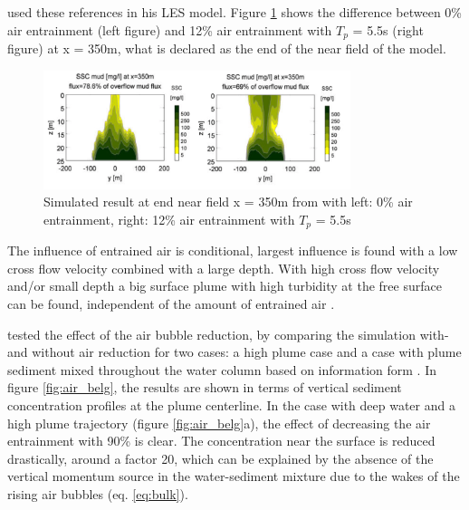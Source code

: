 \noindent \cite{Dewit} used these references in his LES model. Figure \ref{fig:air_dewit} shows the difference between 0\% air entrainment (left figure) and 12\% air entrainment with $T_p$ = 5.5s (right figure) at x = 350m, what is declared as the end of the near field of the model. 

\begin{figure}[ht!]
    \centering
    \includegraphics[width = 0.8\textwidth]{Images/air_0_12.png}
    \caption{Simulated result at end near field x =  350m from \cite{Dewit} with left: 0\% air entrainment, right: 12\% air entrainment with $T_p$ = 5.5s}
    \label{fig:air_dewit}
\end{figure}

\noindent The influence of entrained air is conditional, largest influence is found with a low cross flow velocity combined with a large depth. With high cross flow velocity and/or small depth a big surface plume with high turbidity at the free surface can be found, independent of the amount of entrained air \citep{Dewit}. \newline

\noindent \cite{Decrop} tested the effect of the air bubble reduction, by comparing the simulation with- and without air reduction for two cases: a high plume case and a case with plume sediment mixed throughout the water column based on information form \cite{Saremi+}. In figure \ref{fig:air_belg}, the results are shown in terms of vertical sediment concentration profiles at the plume centerline. In the case with deep water and a high plume trajectory (figure \ref{fig:air_belg}a), the effect of decreasing the air entrainment with 90\% is clear. The concentration near the surface is reduced drastically, around a factor 20, which can be explained by the absence of the vertical momentum source in the water-sediment mixture due to the wakes of the rising air bubbles (eq. \ref{eq:bulk}).

